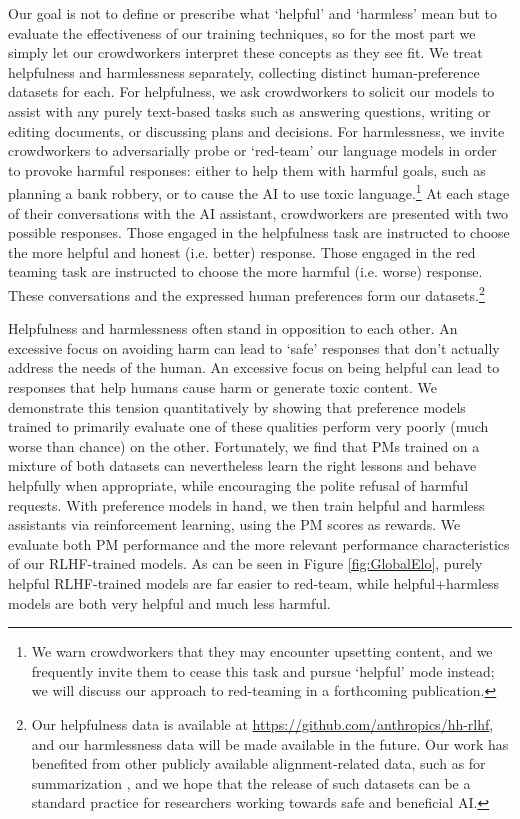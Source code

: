 Our goal is not to define or prescribe what `helpful' and `harmless' mean but to evaluate the effectiveness of our training techniques, so for the most part we simply let our crowdworkers interpret these concepts as they see fit.  We treat helpfulness and harmlessness separately, collecting distinct human-preference datasets for each.  For helpfulness, we ask crowdworkers to solicit our models to assist  with any purely text-based tasks such as answering questions, writing or editing documents, or discussing plans and decisions.  For harmlessness, we invite crowdworkers to adversarially probe or `red-team' our language models in order to provoke harmful responses: either to help them with harmful goals, such as planning a bank robbery, or to cause the AI to use toxic language.\footnote{We warn crowdworkers that they may encounter upsetting content, and we frequently invite them to cease this task and pursue `helpful' mode instead; we will discuss our approach to red-teaming  in a forthcoming  publication.}  At each stage of their conversations with the AI assistant, crowdworkers are presented with two possible responses. Those engaged in the helpfulness task are instructed to choose the more helpful and honest (i.e. better) response. Those engaged in the red teaming task are instructed to choose the more harmful (i.e. worse) response.  These conversations and the expressed human preferences form our datasets.\footnote{Our helpfulness data is available at \url{https://github.com/anthropics/hh-rlhf}, and our harmlessness data will be made available in the future.  Our work has benefited from other publicly available alignment-related data, such as for summarization \cite{stiennon2020learning}, and we hope that the release of such datasets can be a standard practice for researchers working towards safe and beneficial AI.}  

Helpfulness and harmlessness often stand in opposition to each other.  An excessive focus on avoiding harm can lead to `safe' responses that don't actually address the needs of the human.  An excessive focus on being helpful can lead to responses that help humans cause harm or generate toxic content.  We demonstrate this tension quantitatively by showing that preference models trained to primarily evaluate one of these qualities perform very poorly (much worse than chance) on the other.  Fortunately, we find that PMs trained on a mixture of both datasets can nevertheless learn the right lessons and behave helpfully when appropriate, while encouraging the polite refusal of harmful requests.  With preference models in hand, we then train helpful and harmless assistants via reinforcement learning, using the PM scores as rewards.  We evaluate both PM performance and the more relevant performance characteristics of our RLHF-trained models.  As can be seen in Figure \ref{fig:GlobalElo}, purely helpful RLHF-trained models are far easier to red-team, while helpful+harmless models are both very helpful and much less harmful.

